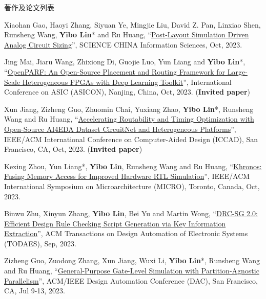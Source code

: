 \begin{rSection}{著作及论文列表}
\begin{description}[font=\normalfont, rightmargin=2em]
{}
            

\item[{[J127]}]{
        Xiaohan Gao, Haoyi Zhang, Siyuan Ye, Mingjie Liu, David Z. Pan, Linxiao Shen, Runsheng Wang, \textbf{Yibo Lin}* and Ru Huang, 
    ``\href{https://doi.org/10.1007/s11432-022-3878-5}{Post-Layout Simulation Driven Analog Circuit Sizing}'', 
    SCIENCE CHINA Information Sciences, Oct, 2023.
    
}
            

\item[{[C126]}]{
        Jing Mai, Jiaru Wang, Zhixiong Di, Guojie Luo, Yun Liang and \textbf{Yibo Lin}*, 
    ``\href{https://doi.org/10.1109/ASICON58565.2023.10396248}{OpenPARF: An Open-Source Placement and Routing Framework for Large-Scale Heterogeneous FPGAs with Deep Learning Toolkit}'', 
    International Conference on ASIC (ASICON), Nanjing, China, Oct, 2023.
    (\textbf{Invited paper})
}
            

\item[{[C125]}]{
        Xun Jiang, Zizheng Guo, Zhuomin Chai, Yuxiang Zhao, \textbf{Yibo Lin}*, Runsheng Wang and Ru Huang, 
    ``\href{https://doi.org/10.1109/ICCAD57390.2023.10323938}{Accelerating Routability and Timing Optimization with Open-Source AI4EDA Dataset CircuitNet and Heterogeneous Platforms}'', 
    IEEE/ACM International Conference on Computer-Aided Design (ICCAD), San Francisco, CA, Oct, 2023.
    (\textbf{Invited paper})
}
            

\item[{[C124]}]{
        Kexing Zhou, Yun Liang*, \textbf{Yibo Lin}, Runsheng Wang and Ru Huang, 
    ``\href{https://doi.org/10.1145/3613424.3614301}{Khronos: Fusing Memory Access for Improved Hardware RTL Simulation}'', 
    IEEE/ACM International Symposium on Microarchitecture (MICRO), Toronto, Canada, Oct, 2023.
    
}
            

\item[{[J123]}]{
        Binwu Zhu, Xinyun Zhang, \textbf{Yibo Lin}, Bei Yu and Martin Wong, 
    ``\href{https://doi.org/10.1145/3594666}{DRC-SG 2.0: Efficient Design Rule Checking Script Generation via Key Information Extraction}'', 
    ACM Transactions on Design Automation of Electronic Systems (TODAES), Sep, 2023.
    
}
            

\item[{[C122]}]{
        Zizheng Guo, Zuodong Zhang, Xun Jiang, Wuxi Li, \textbf{Yibo Lin}*, Runsheng Wang and Ru Huang, 
    ``\href{https://doi.org/10.1109/DAC56929.2023.10247907}{General-Purpose Gate-Level Simulation with Partition-Agnostic Parallelism}'', 
    ACM/IEEE Design Automation Conference (DAC), San Francisco, CA, Jul 9-13, 2023.
    
}
\end{description}
\end{rSection}
